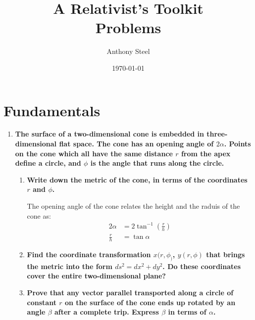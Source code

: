 \documentclass[9pt]{report}
\begin{document}
\title{A Relativist's Toolkit\protect\\ Problems}
\author{Anthony Steel}
\date{\today}
\maketitle
\chapter{Fundamentals}
\begin{enumerate}
  \item \textbf{The surface of a two-dimensional cone is embedded in
      three-dimensional flat space. The cone has an opening angle of
      $2\alpha$. Points on the cone which all have the same distance
      $r$ from the apex define a circle, and $\phi$ is the angle that
      runs along the circle.
    }
    \begin{enumerate}
      \item \textbf{Write down the metric of the cone, in terms of the
        coordinates $r$ and $\phi$.}


        The opening angle of the cone relates the height and the 
        raduis of the cone as:
        \[
          \begin{align}
            2\alpha &= 2\tan^{-1}(\frac{r}{h})\\
            \frac{r}{h} &= \tan\alpha
          \end{align}
        \]
      \item \textbf{Find the coordinate transformation $x(r,\phi_)$,
          $y(r,\phi)$ that brings the metric into the form $ds^2
        = dx^2+dy^2$. Do these coordinates cover the entire
        two-dimensional plane?}
      \item \textbf{Prove that any vector parallel transported along a
        circle of constant $r$ on the surface of the cone ends up rotated
        by an angle $\beta$ after a complete trip. Express $\beta$ in terms
        of $\alpha$.}
    \end{enumerate}
\end{enumerate}
\end{document}
